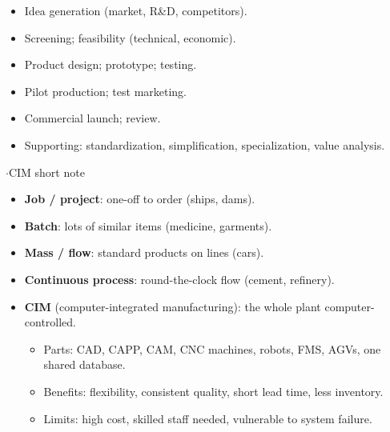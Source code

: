 {\color{sub}\footnotesize {} }
\begin{itemize}
  \item Idea generation (market, R\&D, competitors).
  \item Screening; feasibility (technical, economic).
  \item Product design; prototype; testing.
  \item Pilot production; test marketing.
  \item Commercial launch; review.
  \item Supporting: standardization, simplification, specialization, value analysis.
\end{itemize}

{\color{sub}\footnotesize {}  \gap$\cdot$\gap CIM short note}
\begin{itemize}
  \item \textbf{Job / project}: one-off to order (ships, dams).
  \item \textbf{Batch}: lots of similar items (medicine, garments).
  \item \textbf{Mass / flow}: standard products on lines (cars).
  \item \textbf{Continuous process}: round-the-clock flow (cement, refinery).
  \item \textbf{CIM} (computer-integrated manufacturing): the whole plant computer-controlled.
  \begin{itemize}
    \item Parts: CAD, CAPP, CAM, CNC machines, robots, FMS, AGVs, one shared database.
    \item Benefits: flexibility, consistent quality, short lead time, less inventory.
    \item Limits: high cost, skilled staff needed, vulnerable to system failure.
  \end{itemize}
\end{itemize}

\vspace{2pt}


